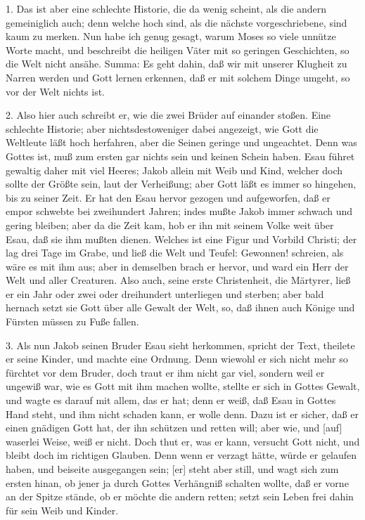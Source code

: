 1. Das ist aber eine schlechte Historie, die da wenig scheint, als die andern gemeiniglich auch; denn welche hoch sind, als die nächste vorgeschriebene, sind kaum zu merken. Nun habe ich genug gesagt, warum Moses so viele unnütze Worte macht, und beschreibt die heiligen Väter mit so geringen Geschichten, so die Welt nicht ansähe. Summa: Es geht dahin, daß wir mit unserer Klugheit zu Narren werden und Gott lernen erkennen, daß er mit solchem Dinge umgeht, so vor der Welt nichts ist.

2. Also hier auch schreibt er, wie die zwei Brüder auf einander stoßen. Eine schlechte Historie; aber nichtsdestoweniger dabei angezeigt, wie Gott die Weltleute läßt hoch herfahren, aber die Seinen geringe und ungeachtet. Denn was Gottes ist, muß zum ersten gar nichts sein und keinen Schein haben. Esau führet gewaltig daher mit viel Heeres; Jakob allein mit Weib und Kind, welcher doch sollte der Größte sein, laut der Verheißung; aber Gott läßt es immer so hingehen, bis zu seiner Zeit. Er hat den Esau hervor gezogen und aufgeworfen, daß er empor schwebte bei zweihundert Jahren; indes mußte Jakob immer schwach und gering bleiben; aber da die Zeit kam, hob er ihn mit seinem Volke weit über Esau, daß sie ihm mußten dienen. Welches ist eine Figur und Vorbild Christi; der lag drei Tage im Grabe, und ließ die Welt und Teufel: Gewonnen! schreien, als wäre es mit ihm aus; aber in demselben brach er hervor, und ward ein Herr der Welt und aller Creaturen. Also auch, seine erste Christenheit, die Märtyrer, ließ er ein Jahr oder zwei oder dreihundert unterliegen und sterben; aber bald hernach setzt sie Gott über alle Gewalt der Welt, so, daß ihnen auch Könige und Fürsten müssen zu Fuße fallen.

3. Als nun Jakob seinen Bruder Esau sieht herkommen, spricht der Text, theilete er seine Kinder, und machte eine Ordnung. Denn wiewohl er sich nicht mehr so fürchtet vor dem Bruder, doch traut er ihm nicht gar viel, sondern weil er ungewiß war, wie es Gott mit ihm machen wollte, stellte er sich in Gottes Gewalt, und wagte es darauf mit allem, das er hat; denn er weiß, daß Esau in Gottes Hand steht, und ihm nicht schaden kann, er wolle denn. Dazu ist er sicher, daß er einen gnädigen Gott hat, der ihn schützen und retten will; aber wie, und [auf] waserlei Weise, weiß er nicht. Doch thut er, was er kann, versucht Gott nicht, und bleibt doch im richtigen Glauben. Denn wenn er verzagt hätte, würde er gelaufen haben, und beiseite ausgegangen sein; [er] steht aber still, und wagt sich zum ersten hinan, ob jener ja durch Gottes Verhängniß schalten wollte, daß er vorne an der Spitze stände, ob er möchte die andern retten; setzt sein Leben frei dahin für sein Weib und Kinder.

